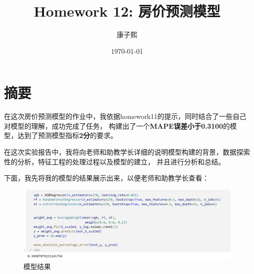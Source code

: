 \documentclass{ctexart}
\title{Homework 12: 房价预测模型}
\author{康子熙}
\date{\today}
\begin{document}
\maketitle

\section{摘要}
在这次房价预测模型的作业中，我依据homework11的提示，同时结合了一些自己对模型的理解，成功完成了任务，
构建出了一个\textbf{MAPE误差小于0.3100}的模型，达到了预测模型指标\textbf{2分}的要求。\par
在这次实验报告中，我将向老师和助教学长详细的说明模型构建的背景，数据探索性的分析，特征工程的处理过程以及模型的建立，
并且进行分析和总结。\par
下面，我先将我的模型的结果展示出来，以便老师和助教学长查看：
\begin{figure}[H]
    \centering
    \includegraphics[scale=0.5]{./output.png}
    \caption{模型结果}
    \label{figure}
\end{figure}
\par
\end{document}
